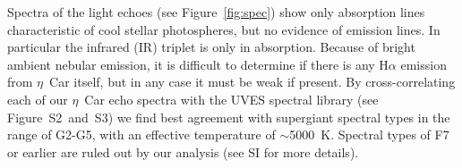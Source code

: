Spectra of the light echoes (see Figure~\ref{fig:spec}) show
only absorption lines characteristic of cool stellar photospheres, but
no evidence of emission lines.  In 
particular the
 infrared (IR) triplet is only in absorption.
Because of bright ambient nebular emission, it is
difficult to determine if there is any H$\alpha$ emission from $\eta$~Car
itself, but in any case it must be weak if present.  By
cross-correlating each of our $\eta$~Car echo spectra with the UVES
spectral library\cite{Bagnulo03} (see
Figure~S2~and~S3) 
\ifcheck
\fi
we find best agreement
with supergiant spectral types in the range of G2-G5, with an
effective temperature of $\sim$5000~K. Spectral types of F7 or earlier
are ruled out by our analysis (see SI for more details).



